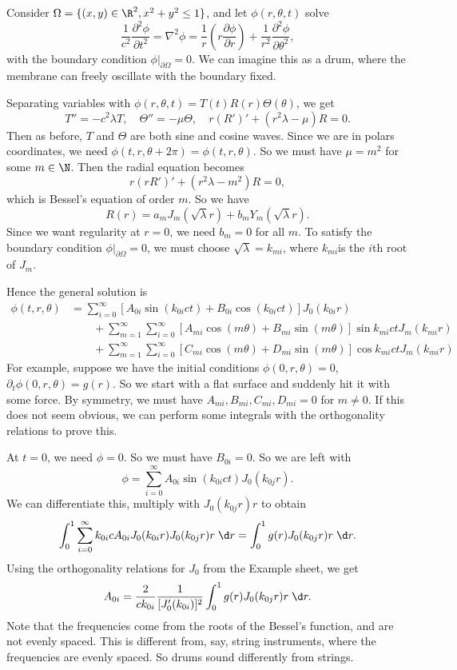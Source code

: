 \documentclass[a4paper]{article}
\begin{document}
\begin{eg}
  Consider $\Omega = \{(x, y) \in \R^2, x^2 + y^2 \leq 1\}$, and let $\phi(r, \theta, t)$ solve
  \[
    \frac{1}{c^2}\frac{\partial^2 \phi}{\partial t^2} = \nabla^2 \phi = \frac{1}{r} \left(r \frac{\partial \phi}{\partial r}\right) + \frac{1}{r^2}\frac{\partial^2\phi}{\partial \theta^2},
  \]
  with the boundary condition $\phi|_{\partial \Omega} = 0$. We can imagine this as a drum, where the membrane can freely oscillate with the boundary fixed.

  Separating variables with $\phi(r, \theta, t) = T(t) R(r) \Theta(\theta)$, we get
  \[
    T'' = - c^2 \lambda T,\quad \Theta'' = -\mu \Theta,\quad r(R')' + (r^2\lambda - \mu)R = 0.
  \]
  Then as before, $T$ and $\Theta$ are both sine and cosine waves. Since we are in polars coordinates, we need $\phi(t, r, \theta + 2\pi) = \phi(t, r, \theta)$. So we must have $\mu = m^2$ for some $m \in \N$. Then the radial equation becomes
  \[
    r(rR')' + (r^2 \lambda - m^2) R = 0,
  \]
  which is Bessel's equation of order $m$. So we have
  \[
    R(r) = a_m J_m(\sqrt{\lambda} r) + b_m Y_m(\sqrt{\lambda} r).
  \]
  Since we want regularity at $r = 0$, we need $b_m = 0$ for all $m$. To satisfy the boundary condition $\phi|_{\partial \Omega} = 0$, we must choose $\sqrt{\lambda} = k_{mi}$, where $k_{mi}$is the $i$th root of $J_m$.

  Hence the general solution is
  \begin{align*}
    \phi(t, r, \theta) &= \sum_{i = 0}^\infty [A_{0i}\sin (k_{0i} ct) + B_{0i}\cos(k_{0i}ct)] J_0 (k_{0i}r)\\\
    &\quad\quad +\sum_{m = 1}^\infty\sum_{i = 0}^\infty [A_{mi}\cos (m \theta) + B_{mi}\sin (m\theta)]\sin k_{mi}ct J_m (k_{mi} r)\\
    &\quad\quad +\sum_{m = 1}^\infty\sum_{i = 0}^\infty [C_{mi}\cos (m \theta) + D_{mi}\sin (m\theta)]\cos k_{mi}ct J_m (k_{mi} r)
  \end{align*}
  For example, suppose we have the initial conditions $\phi(0, r, \theta) = 0$, $\partial_t \phi(0, r, \theta) = g(r)$. So we start with a flat surface and suddenly hit it with some force. By symmetry, we must have $A_{mi}, B_{mi}, C_{mi}, D_{mi} = 0$ for $m \not= 0$. If this does not seem obvious, we can perform some integrals with the orthogonality relations to prove this.

  At $t = 0$, we need $\phi = 0$. So we must have $B_{0i} = 0$. So we are left with
  \[
    \phi = \sum_{i = 0}^\infty A_{0i} \sin (k_{0i} ct) J_0(k_{0j}r).
  \]
  We can differentiate this, multiply with $J_0(k_{0j} r) r$ to obtain
  \[
    \int_0^1 \sum_{i = 0}^\infty k_{0i}c A_{0i}J_0(k_{0i}r) J_0(k_{0j} r)r\;\d r = \int_0^1 g(r) J_0(k_{0j}r)r \;\d r.
  \]
  Using the orthogonality relations for $J_0$ from the Example sheet, we get
  \[
    A_{0i} = \frac{2}{ck_{0i}} \frac{1}{[J_0'(k_{0i})]^2} \int_0^1 g(r)J_0(k_{0j} r) r\;\d r.
  \]
  Note that the frequencies come from the roots of the Bessel's function, and are not evenly spaced. This is different from, say, string instruments, where the frequencies are evenly spaced. So drums sound differently from strings.
\end{eg}
\end{document}

